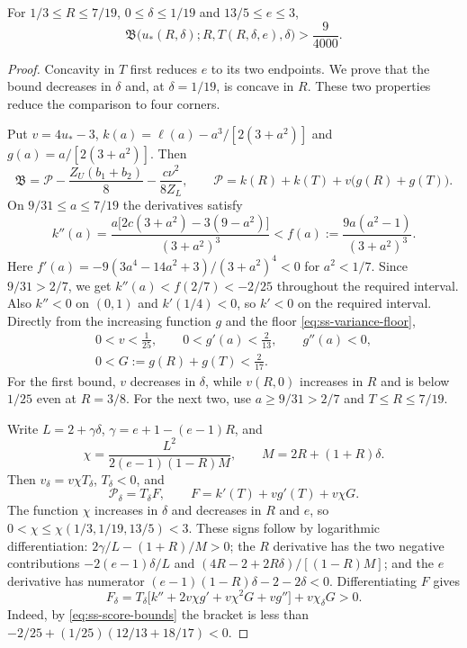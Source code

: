 \begin{proposition}\label{prop:ss-face-S6}
For $1/3\le R\le7/19$, $0\le\delta\le1/19$ and $13/5\le e\le3$,
\[
  \mathfrak B\bigl(u_*(R,\delta);R,T(R,\delta,e),\delta\bigr)>\frac9{4000}.
\]
\end{proposition}

\begin{proof}
Concavity in $T$ first reduces $e$ to its two endpoints. We prove that the bound decreases in
$\delta$ and, at $\delta=1/19$, is concave in $R$. These two properties reduce the comparison
to four corners.

 Put
$v=4u_*-3$, $k(a)=\ell(a)-a^3/[2(3+a^2)]$ and $g(a)=a/[2(3+a^2)]$. Then
\[
 \mathfrak B=\mathcal P-\frac{Z_U(b_1+b_2)}8-\frac{c\nu^2}{8Z_L},
 \qquad
 \mathcal P=k(R)+k(T)+v\bigl(g(R)+g(T)\bigr).
\]
On $9/31\le a\le7/19$ the derivatives satisfy
\[
 k''(a)
 =\frac{a\bigl[2c(3+a^2)-3(9-a^2)\bigr]}{(3+a^2)^3}
 <f(a):=\frac{9a(a^2-1)}{(3+a^2)^3}.
\]
Here $f'(a)=-9(3a^4-14a^2+3)/(3+a^2)^4<0$ for $a^2<1/7$.
Since $9/31>2/7$, we get $k''(a)<f(2/7)<-2/25$ throughout the required interval.
Also $k''<0$ on $(0,1)$ and $k'(1/4)<0$, so $k'<0$ on the required interval. Directly from
the increasing function $g$ and the floor \eqref{eq:ss-variance-floor},
\begin{equation}\label{eq:ss-score-bounds}
\begin{gathered}
 0<v<\frac1{25},\qquad 0<g'(a)<\frac2{13},\qquad g''(a)<0,\\
 0<G:=g(R)+g(T)<\frac2{17}.
\end{gathered}
\end{equation}
For the first bound, $v$ decreases in $\delta$, while $v(R,0)$ increases in $R$ and is below
$1/25$ even at $R=3/8$. For the next two, use $a\ge9/31>2/7$ and $T\le R\le7/19$.

 Write
$L=2+\gamma\delta$, $\gamma=e+1-(e-1)R$, and
\[
 \chi=\frac{L^2}{2(e-1)(1-R)M},\qquad M=2R+(1+R)\delta .
\]
Then $v_\delta=v\chi T_\delta$, $T_\delta<0$, and
\[
 \mathcal P_\delta=T_\delta F,\qquad
 F=k'(T)+vg'(T)+v\chi G.
\]
The function $\chi$ increases in $\delta$ and decreases in $R$ and $e$, so
$0<\chi\le\chi(1/3,1/19,13/5)<3$. These signs follow by logarithmic differentiation:
$2\gamma/L-(1+R)/M>0$; the $R$ derivative has the two negative contributions
$-2(e-1)\delta/L$ and $(4R-2+2R\delta)/[(1-R)M]$; and the $e$ derivative has numerator
$(e-1)(1-R)\delta-2-2\delta<0$.
Differentiating $F$ gives
\[
 F_\delta=T_\delta\bigl[k''+2v\chi g'+v\chi^2G+vg''\bigr]+v\chi_\delta G>0.
\]
Indeed, by \eqref{eq:ss-score-bounds} the bracket is less than
$-2/25+(1/25)(12/13+18/17)<0$.


\end{proof}
